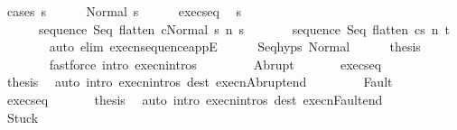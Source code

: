 \begin{isabellebody}
\ {\isacharparenleft}cases\ s{\isacharparenright}\isanewline
\ \ \ \ \isamarkupfalse%
\ {\isacharparenleft}Normal\ s{\isacharprime}{\isacharparenright}\isanewline
\ \ \ \ \isamarkupfalse%
\ exec{\isacharunderscore}seq\ \isamarkupfalse%
\ s{\isacharprime}{\isacharprime}\ \isanewline
\ \ \ \ \ \ {\isachardoublequoteopen}{\isasymGamma}{\isasymturnstile}{\isasymlangle}sequence\ Seq\ {\isacharparenleft}flatten\ c{}{\isacharparenright}{\isacharcomma}Normal\ s{\isacharprime}{\isasymrangle}\ {\isacharequal}n{\isasymRightarrow}\ s{\isacharprime}{\isacharprime}{\isachardoublequoteclose}\ \isanewline
\ \ \ \ \ \ {\isachardoublequoteopen}{\isasymGamma}{\isasymturnstile}{\isasymlangle}sequence\ Seq\ {\isacharparenleft}flatten\ c{}{\isacharparenright}{\isacharcomma}s{\isacharprime}{\isacharprime}{\isasymrangle}\ {\isacharequal}n{\isasymRightarrow}\ t{\isachardoublequoteclose}\isanewline
\ \ \ \ \ \ \isamarkupfalse%
\ {\isacharparenleft}auto\ elim{\isacharcolon}\ execn{\isacharunderscore}sequence{\isacharunderscore}appE{\isacharparenright}\isanewline
\ \ \ \ \isamarkupfalse%
\ Seq{\isachardot}hyps\ Normal\isanewline
\ \ \ \ \isamarkupfalse%
\ {\isacharquery}thesis\isanewline
\ \ \ \ \ \ \isamarkupfalse%
\ {\isacharparenleft}fastforce\ intro{\isacharcolon}\ execn{\isachardot}intros{\isacharparenright}\isanewline
\ \ \isamarkupfalse%
\isanewline
\ \ \ \ \isamarkupfalse%
\ Abrupt\ \isanewline
\ \ \ \ \isamarkupfalse%
\ exec{\isacharunderscore}seq\ \isanewline
\ \ \ \ \isamarkupfalse%
\ {\isacharquery}thesis\ \isamarkupfalse%
\ {\isacharparenleft}auto\ intro{\isacharcolon}\ execn{\isachardot}intros\ dest{\isacharcolon}\ execn{\isacharunderscore}Abrupt{\isacharunderscore}end{\isacharparenright}\isanewline
\ \ \isamarkupfalse%
\isanewline
\ \ \ \ \isamarkupfalse%
\ Fault\ \isanewline
\ \ \ \ \isamarkupfalse%
\ exec{\isacharunderscore}seq\ \isanewline
\ \ \ \ \isamarkupfalse%
\ {\isacharquery}thesis\ \isamarkupfalse%
\ {\isacharparenleft}auto\ intro{\isacharcolon}\ execn{\isachardot}intros\ dest{\isacharcolon}\ execn{\isacharunderscore}Fault{\isacharunderscore}end{\isacharparenright}\isanewline
\ \ \isamarkupfalse%
\isanewline
\ \ \ \ \isamarkupfalse%
\ Stuck\ \isanewline
\ \ \ \ \isamarkupfalse%

\end{isabellebody}
